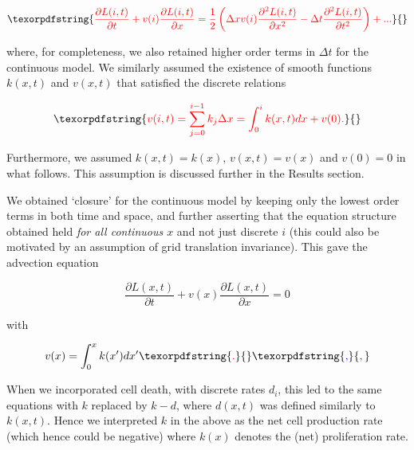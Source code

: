 \documentclass[10pt,letterpaper]{article}
\providecommand{\DIFaddtex}[1]{{\protect\color{blue} \sf #1}} %
\providecommand{\DIFdeltex}[1]{{\protect\color{red} \scriptsize #1}} %
\providecommand{\DIFaddbegin}{} %
\providecommand{\DIFaddend}{} %
\providecommand{\DIFdelbegin}{} %
\providecommand{\DIFdelend}{} %
\providecommand{\DIFadd}[1]{\texorpdfstring{\DIFaddtex{#1}}{#1}} %
\providecommand{\DIFdel}[1]{\texorpdfstring{\DIFdeltex{#1}}{}} %
\begin{document}
\begin{displaymath}\DIFdel{\frac{\partial L(i,t)}{\partial t} + v(i)\frac{\partial L(i,t)}{\partial x} = \frac{1}{2}\left(\Delta x v(i) \frac{\partial^2 L(i,t)}{\partial x^2} - \Delta t \frac{\partial^2 L(i,t)}{\partial t^2}\right) + ...%
}\end{displaymath}

\DIFdel{where, for completeness, we also retained higher order terms in
\(\Delta t\) for the continuous model. We similarly assumed the
existence of smooth functions \(k(x,t)\) and \(v(x,t)\) that satisfied
the discrete relations
}%

\begin{displaymath}\DIFdel{v(i,t) = \sum_{j=0}^{i-1} k_j \Delta x = \int_0^{i} k(x,t) dx + v(0). %
}\end{displaymath}

\DIFdel{Furthermore, we assumed \(k(x,t) = k(x)\), \(v(x,t) = v(x)\) and
\(v(0) = 0\) in what follows. This assumption is discussed further in
the Results section.
}%

\DIFdel{We obtained `closure' for the continuous model by keeping only the
lowest order terms in both time and space, and further asserting that
the equation structure obtained held \emph{for all continuous \(x\)} and
not just discrete \(i\) (this could also be motivated by an assumption
of grid translation invariance). This gave the advection equation
}%

\DIFdelend \begin{equation}\frac{\partial L(x,t)}{\partial t} + v(x)\frac{\partial L(x,t)}{\partial x} = 0\label{eq:model-pde}\end{equation}

with

\begin{equation}v(x) = \int_0^{x} k(x') dx'\DIFdelbegin \DIFdel{.}\DIFdelend \DIFaddbegin \DIFadd{,}\DIFaddend \label{eq:model-veloc}\end{equation}

\DIFdelbegin \DIFdel{When we incorporated cell death, with discrete rates \(d_i\), this led
to the same equations with \(k\) replaced by \(k-d\), where \(d(x,t)\)
was defined similarly to \(k(x,t)\). Hence we interpreted \(k\) in the above as the net cell production rate (which hence could be negative) }\DIFdelend \DIFaddbegin \DIFadd{where \(k(x)\) denotes the (net) proliferation rate}\DIFaddend .
\end{document}
